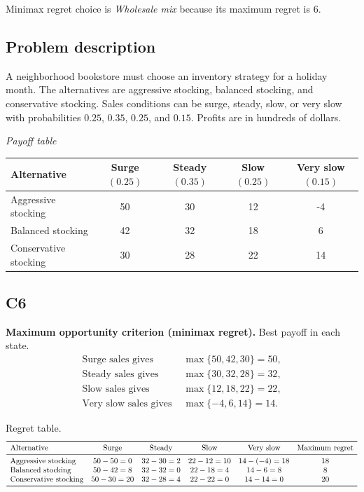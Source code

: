 \begin{ExamProblems}
		Minimax regret choice is \emph{Wholesale mix} because its maximum regret is $6$.

		\item
		\subsection*{Problem description}
		A neighborhood bookstore must choose an inventory strategy for a holiday month. The alternatives are aggressive stocking, balanced stocking, and conservative stocking. Sales conditions can be surge, steady, slow, or very slow with probabilities $0.25$, $0.35$, $0.25$, and $0.15$. Profits are in hundreds of dollars.

		\begin{center}
			\textit{Payoff table}\\
			\begin{tabular}{l c c c c}
				\toprule
				Alternative & Surge $(0.25)$ & Steady $(0.35)$ & Slow $(0.25)$ & Very slow $(0.15)$ \\
				\midrule
				Aggressive stocking & 50 & 30 & 12 & -4 \\
				Balanced stocking & 42 & 32 & 18 & 6 \\
				Conservative stocking & 30 & 28 & 22 & 14 \\
				\bottomrule
			\end{tabular}
		\end{center}

		\subsection*{C6}
		\textbf{Maximum opportunity criterion (minimax regret).} Best payoff in each state.
		\[
		\begin{aligned}
		\text{Surge sales gives } &\max\{50,42,30\}=50,\\
		\text{Steady sales gives } &\max\{30,32,28\}=32,\\
		\text{Slow sales gives } &\max\{12,18,22\}=22,\\
		\text{Very slow sales gives } &\max\{-4,6,14\}=14.
		\end{aligned}
		\]

		Regret table.
		\[
		\begin{array}{lccccc}
			\toprule
			\text{Alternative} & \text{Surge} & \text{Steady} & \text{Slow} & \text{Very slow} & \text{Maximum regret}\\
			\midrule
			\text{Aggressive stocking} & 50-50=0 & 32-30=2 & 22-12=10 & 14-(-4)=18 & 18\\
			\text{Balanced stocking} & 50-42=8 & 32-32=0 & 22-18=4 & 14-6=8 & 8\\
			\text{Conservative stocking} & 50-30=20 & 32-28=4 & 22-22=0 & 14-14=0 & 20\\
			\bottomrule
		\end{array}
		\]


\end{ExamProblems}
